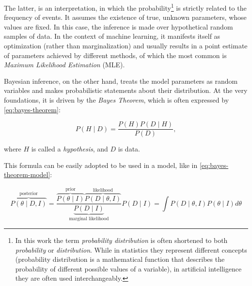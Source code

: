 \vspace{\baselineskip}
The latter, is an interpretation, in which the probability\footnote{In this work the term \textit{probability distribution} is often shortened to both \textit{probability} or \textit{distribution}. While in statistics they represent different concepts (probability distribution is a mathematical function that describes the probability of different possible values of a variable), in artificial intelligence they are often used interchangeably.} is strictly related to the frequency of events. It assumes the existence of true, unknown parameters, whose values are fixed. In this case, the inference is made over hypothetical random samples of data. In the context of machine learning, it manifests itself as optimization (rather than marginalization) and usually results in a point estimate of parameters achieved by different methods, of which the most common is \textit{Maximum Likelihood Estimation} (MLE).


\vspace{\baselineskip}
Bayesian inference, on the other hand, treats the model parameters as random variables and makes probabilistic statements about their distribution. At the very foundations, it is driven by the \textit{Bayes Theorem}, which is often expressed by \autoref{eq:bayes-theorem}:

\begin{equation}\label{eq:bayes-theorem}
    P(H \mid D) = \frac{P(H)P(D \mid H)}{P(D)},
\end{equation}

\noindent where $H$ is called a \textit{hypothesis}, and $D$ is data.

\vspace{\baselineskip}
This formula can be easily adopted to be used in a model, like in \autoref{eq:bayes-theorem-model}:

\begin{subequations}
    \begin{equation}\label{eq:bayes-theorem-model}
        \overbrace{P(\theta \mid D, I)}^{\text{posterior}} = \frac{\overbrace{P(\theta \mid I)}^{\text{prior}}\overbrace{P(D \mid \theta, I)}^{\text{likelihood}}}{\underbrace{P(D \mid I)}_{\text{marginal likelihood}}}
    \end{equation}
    \begin{equation}\label{eq:bayes-theorem-model-marginalization}
        P(D \mid I) = \int P(D \mid \theta, I)P(\theta \mid I)d\theta
    \end{equation}
\end{subequations}

